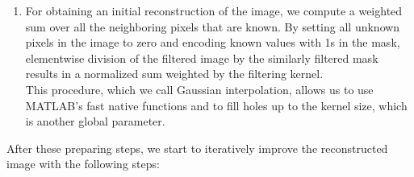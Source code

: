 \documentclass[10pt,conference,compsocconf]{IEEEtran}
\begin{document}
\begin{enumerate}
\item For obtaining an initial reconstruction of the image, we compute a weighted sum over all the neighboring pixels that are known. By setting all unknown pixels in the image to zero and encoding known values with 1s in the mask, elementwise division of the filtered image by the similarly filtered mask results in a normalized sum weighted by the filtering kernel.\\
This procedure, which we call Gaussian interpolation, allows us to use MATLAB's fast native functions and to fill holes up to the kernel size, which is another global parameter.
\label{gaussian_interpolation}
\end{enumerate}

After these preparing steps, we start to iteratively improve the reconstructed image with the following steps:
\end{document}
